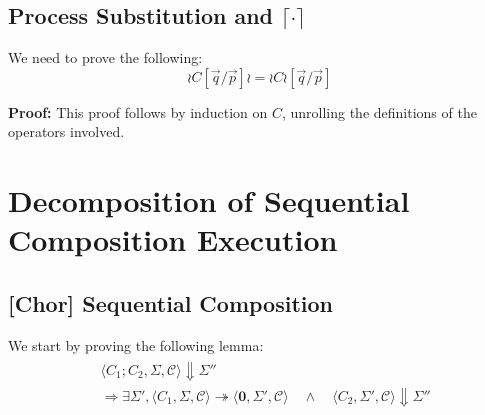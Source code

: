 \documentclass[12pt,a4paper,twoside]{book}
\begin{document}
\begin{appendices}
\section{Process Substitution and $\lceil \cdot \rceil$}
We need to prove the following:
$$\wr C [\vec{q}/\vec{p}] \wr = \wr C \wr [\vec{q}/\vec{p}]$$

\noindent\textbf{Proof:}
This proof follows by induction on $C$, unrolling the definitions of the operators involved.


\chapter{Decomposition of Sequential Composition Execution}
\label{appdix:B}
\section{\textbf{[Chor]} Sequential Composition}
We start by proving the following lemma:
\begin{align}
\begin{split}
\label{appdix:Bskin}
&\langle C_1 ; C_2, \Sigma, \mathscr{C}\rangle \Downarrow \Sigma''\\
&\Rightarrow \exists \Sigma',
\langle C_1, \Sigma, \mathscr{C} \rangle \twoheadrightarrow \langle \boldsymbol{0}, \Sigma', \mathscr{C} \rangle 
\quad\land\quad
\langle C_2, \Sigma', \mathscr{C} \rangle \Downarrow \Sigma''
\end{split}
\end{align}


\end{appendices}
\end{document}

